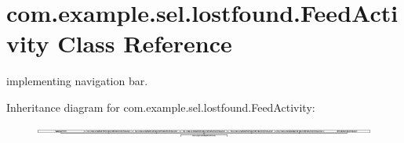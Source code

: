 \hypertarget{classcom_1_1example_1_1sel_1_1lostfound_1_1FeedActivity}{}\section{com.\+example.\+sel.\+lostfound.\+Feed\+Activity Class Reference}
\label{classcom_1_1example_1_1sel_1_1lostfound_1_1FeedActivity}


implementing navigation bar.  


Inheritance diagram for com.\+example.\+sel.\+lostfound.\+Feed\+Activity\+:\begin{figure}[H]
\begin{center}
\leavevmode
\includegraphics[height=0.347826cm]{classcom_1_1example_1_1sel_1_1lostfound_1_1FeedActivity}
\end{center}
\end{figure}
